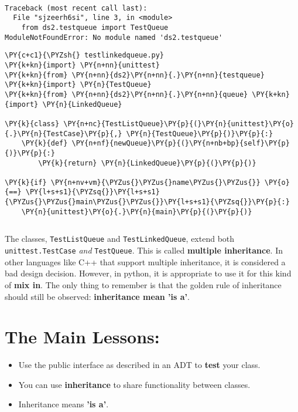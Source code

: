 \begin{Verbatim}

Traceback (most recent call last):
  File "sjzeerh6si", line 3, in <module>
    from ds2.testqueue import TestQueue
ModuleNotFoundError: No module named 'ds2.testqueue'

\end{Verbatim}


\begin{Verbatim}[commandchars=\\\{\}]
\PY{c+c1}{\PYZsh{} testlinkedqueue.py}
\PY{k+kn}{import} \PY{n+nn}{unittest}
\PY{k+kn}{from} \PY{n+nn}{ds2}\PY{n+nn}{.}\PY{n+nn}{testqueue} \PY{k+kn}{import} \PY{n}{TestQueue}
\PY{k+kn}{from} \PY{n+nn}{ds2}\PY{n+nn}{.}\PY{n+nn}{queue} \PY{k+kn}{import} \PY{n}{LinkedQueue}

\PY{k}{class} \PY{n+nc}{TestListQueue}\PY{p}{(}\PY{n}{unittest}\PY{o}{.}\PY{n}{TestCase}\PY{p}{,} \PY{n}{TestQueue}\PY{p}{)}\PY{p}{:}
    \PY{k}{def} \PY{n+nf}{newQueue}\PY{p}{(}\PY{n+nb+bp}{self}\PY{p}{)}\PY{p}{:}
        \PY{k}{return} \PY{n}{LinkedQueue}\PY{p}{(}\PY{p}{)}

\PY{k}{if} \PY{n+nv+vm}{\PYZus{}\PYZus{}name\PYZus{}\PYZus{}} \PY{o}{==} \PY{l+s+s1}{\PYZsq{}}\PY{l+s+s1}{\PYZus{}\PYZus{}main\PYZus{}\PYZus{}}\PY{l+s+s1}{\PYZsq{}}\PY{p}{:}
    \PY{n}{unittest}\PY{o}{.}\PY{n}{main}\PY{p}{(}\PY{p}{)}
\end{Verbatim}

\begin{Verbatim}

\end{Verbatim}


The classes, \texttt{TestListQueue} and \texttt{TestLinkedQueue}, extend both \texttt{unittest.TestCase} \emph{and} \texttt{TestQueue}.
This is called \textbf{multiple inheritance}.
In other languages like C++ that support multiple inheritance, it is considered a bad design decision.
However, in python, it is appropriate to use it for this kind of \textbf{mix in}.
The only thing to remember is that the golden rule of inheritance should still be observed: \textbf{inheritance mean 'is a'}.

\section{The Main Lessons:}

\begin{itemize}

\item Use the public interface as described in an ADT to \textbf{test} your class.

\item You can use \textbf{inheritance} to share functionality between classes.

\item Inheritance means \textbf{'is a'}.

\end{itemize}
